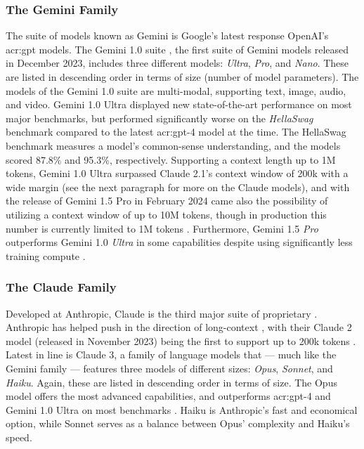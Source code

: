 \subsubsection{The Gemini Family}
\label{subsubsec:gemini}

The suite of models known as Gemini is Google's latest response OpenAI's \acrshort{acr:gpt} models. The Gemini 1.0 suite \citep{geminiteamGeminiFamilyHighly2024}, the first suite of Gemini models released in December 2023, includes three different models: \textit{Ultra}, \textit{Pro}, and \textit{Nano}. These are listed in descending order in terms of size (number of model parameters). The models of the Gemini 1.0 suite are multi-modal, supporting text, image, audio, and video. Gemini 1.0 Ultra displayed new state-of-the-art performance on most major benchmarks, but performed significantly worse on the \textit{HellaSwag} benchmark compared to the latest \acrshort{acr:gpt}-4 model at the time. The HellaSwag benchmark measures a model's common-sense understanding, and the models scored 87.8\% and 95.3\%, respectively. Supporting a context length up to 1M tokens, Gemini 1.0 Ultra surpassed Claude 2.1's context window of 200k with a wide margin (see the next paragraph for more on the Claude models), and with the release of Gemini 1.5 Pro in February 2024 came also the possibility of utilizing a context window of up to 10M tokens, though in production this number is currently limited to 1M tokens \citep{geminiteamGeminiUnlockingMultimodal2024, pichaiOurNextgenerationModel2024}. Furthermore, Gemini 1.5 \textit{Pro} outperforms Gemini 1.0 \textit{Ultra} in some capabilities despite using significantly less training compute \citep[31]{geminiteamGeminiUnlockingMultimodal2024}.

\subsubsection{The Claude Family}
\label{subsubsec:claude}

Developed at Anthropic, Claude is the third major suite of proprietary . Anthropic has helped push in the direction of long-context , with their Claude 2 model (released in November 2023) being the first to support up to 200k tokens \citep[9]{anthropicModelCardEvaluations2023}. Latest in line is Claude 3, a family of language models that --- much like the Gemini family --- features three models of different sizes: \textit{Opus}, \textit{Sonnet}, and \textit{Haiku}. Again, these are listed in descending order in terms of size. The Opus model offers the most advanced capabilities, and outperforms \acrshort{acr:gpt}-4 and Gemini 1.0 Ultra on most benchmarks \citep[6]{anthropicClaudeModelFamily2024}. Haiku is Anthropic's fast and economical option, while Sonnet serves as a balance between Opus' complexity and Haiku's speed.

